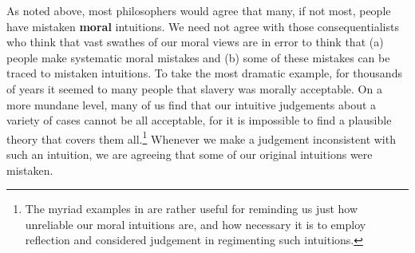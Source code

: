 As noted above, most philosophers would agree that many, if not most, people have mistaken \textbf{moral} intuitions. We need not agree with those consequentialists who think that vast swathes of our moral views are in error to think that (a) people make systematic moral mistakes and (b) some of these mistakes can be traced to mistaken intuitions. To take the most dramatic example, for thousands of years it seemed to many people that slavery was morally acceptable. On a more mundane level, many of us find that our intuitive judgements about a variety of cases cannot be all acceptable, for it is impossible to find a plausible theory that covers them all.\footnote{The myriad examples in \citet{Unger1996} are rather useful for reminding us just how unreliable our moral intuitions are, and how necessary it is to employ reflection and considered judgement in regimenting such intuitions.} Whenever we make a judgement inconsistent with such an intuition, we are agreeing that some of our original intuitions were mistaken.

